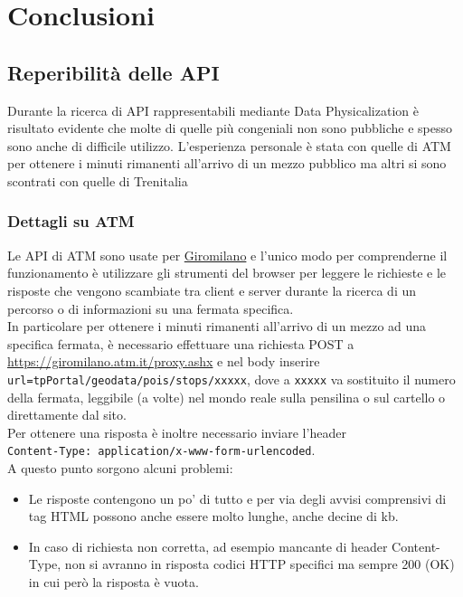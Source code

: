\documentclass[12pt,a4paper]{report}
\begin{document}
\chapter{Conclusioni}


\section{Reperibilità delle API}
Durante la ricerca di API rappresentabili mediante Data Physicalization è risultato evidente che molte di quelle più congeniali non
sono pubbliche e spesso sono anche di difficile utilizzo. L'esperienza personale è stata con quelle di ATM per ottenere i minuti rimanenti
all'arrivo di un mezzo pubblico ma altri si sono scontrati con quelle di Trenitalia \cite{trenitaliashock}

\subsection{Dettagli su ATM}
Le API di ATM sono usate per \href{https://giromilano.atm.it}{Giromilano} e l'unico modo per comprenderne il funzionamento è utilizzare
gli strumenti del browser per leggere le richieste e le risposte che vengono scambiate tra client e server durante la ricerca di un
percorso o di informazioni su una fermata specifica.\\
In particolare per ottenere i minuti rimanenti all'arrivo di un mezzo ad una specifica fermata, è necessario effettuare una richiesta
POST a\\ \url{https://giromilano.atm.it/proxy.ashx} e nel body inserire\\ \texttt{url=tpPortal/geodata/pois/stops/xxxxx}, dove a
\texttt{xxxxx} va sostituito il numero della fermata, leggibile (a volte) nel mondo reale sulla pensilina o sul cartello o direttamente
dal sito.\\
Per ottenere una risposta è inoltre necessario inviare l'header\\ \texttt{Content-Type: application/x-www-form-urlencoded}.\\
A questo punto sorgono alcuni problemi:
\begin{itemize}
  \item Le risposte contengono un po' di tutto e per via degli avvisi comprensivi di tag HTML possono anche essere molto lunghe, anche
        decine di kb.
  \item In caso di richiesta non corretta, ad esempio mancante di header Content-Type, non si avranno in risposta codici HTTP specifici
        ma sempre 200 (OK) in cui però la risposta è vuota.
\end{itemize}
\end{document}
